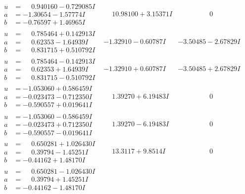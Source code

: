 \documentclass[1p]{elsarticle_modified}
\theoremstyle{definition}
\begin{document}
$$\begin{array}{c|c|c}
\begin{aligned}
u &= \phantom{-}0.940160 - 0.729085 I \\
a &= -1.30654 - 1.57774 I \\
b &= -0.76597 + 1.46965 I\end{aligned}
 & \phantom{-}10.98100 + 3.15371 I & \phantom{-0.000000 } 0 \\ \hline\begin{aligned}
u &= \phantom{-}0.785464 + 0.142913 I \\
a &= \phantom{-}0.62353 - 1.64939 I \\
b &= \phantom{-}0.831715 + 0.510792 I\end{aligned}
 & -1.32910 - 0.60787 I & -3.50485 - 2.67829 I \\ \hline\begin{aligned}
u &= \phantom{-}0.785464 - 0.142913 I \\
a &= \phantom{-}0.62353 + 1.64939 I \\
b &= \phantom{-}0.831715 - 0.510792 I\end{aligned}
 & -1.32910 + 0.60787 I & -3.50485 + 2.67829 I \\ \hline\begin{aligned}
u &= -1.053060 + 0.586459 I \\
a &= -0.023473 - 0.712350 I \\
b &= -0.590557 + 0.019641 I\end{aligned}
 & \phantom{-}1.39270 + 6.19483 I & \phantom{-0.000000 } 0 \\ \hline\begin{aligned}
u &= -1.053060 - 0.586459 I \\
a &= -0.023473 + 0.712350 I \\
b &= -0.590557 - 0.019641 I\end{aligned}
 & \phantom{-}1.39270 - 6.19483 I & \phantom{-0.000000 } 0 \\ \hline\begin{aligned}
u &= \phantom{-}0.650281 + 1.026430 I \\
a &= \phantom{-}0.39794 - 1.45251 I \\
b &= -0.44162 + 1.48170 I\end{aligned}
 & \phantom{-}13.3117 + 9.8514 I & \phantom{-0.000000 } 0 \\ \hline\begin{aligned}
u &= \phantom{-}0.650281 - 1.026430 I \\
a &= \phantom{-}0.39794 + 1.45251 I \\
b &= -0.44162 - 1.48170 I\end{aligned}

\end{array}$$
\end{document}
